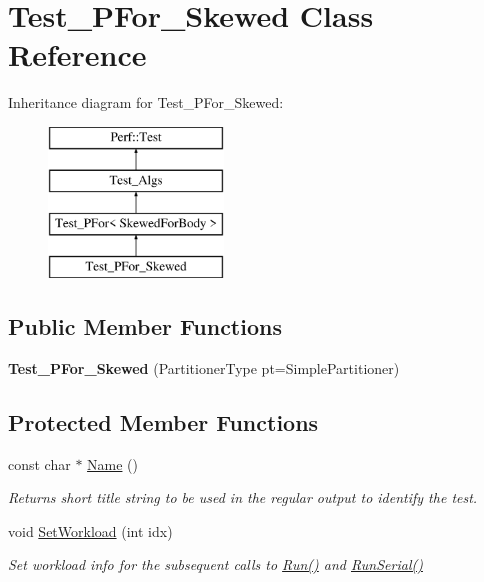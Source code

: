 \hypertarget{classTest__PFor__Skewed}{}\section{Test\+\_\+\+P\+For\+\_\+\+Skewed Class Reference}
\label{classTest__PFor__Skewed}
Inheritance diagram for Test\+\_\+\+P\+For\+\_\+\+Skewed\+:\begin{figure}[H]
\begin{center}
\leavevmode
\includegraphics[height=4.000000cm]{classTest__PFor__Skewed}
\end{center}
\end{figure}
\subsection*{Public Member Functions}
\begin{DoxyCompactItemize}
\item 
\hypertarget{classTest__PFor__Skewed_ae7f02668d34878d1515ba70faf492d5b}{}{\bfseries Test\+\_\+\+P\+For\+\_\+\+Skewed} (Partitioner\+Type pt=Simple\+Partitioner)\label{classTest__PFor__Skewed_ae7f02668d34878d1515ba70faf492d5b}

\end{DoxyCompactItemize}
\subsection*{Protected Member Functions}
\begin{DoxyCompactItemize}
\item 
const char $\ast$ \hyperlink{classTest__PFor__Skewed_a56892af93bf8191333a5d8204df1b233}{Name} ()
\begin{DoxyCompactList}\small\item\em Returns short title string to be used in the regular output to identify the test. \end{DoxyCompactList}\item 
void \hyperlink{classTest__PFor__Skewed_a8844b30c0bbfc98f57a6bc7ae295fcd5}{Set\+Workload} (int idx)
\begin{DoxyCompactList}\small\item\em Set workload info for the subsequent calls to \hyperlink{classTest__PFor_a14d67cebd4bca82da7d103686392618d}{Run()} and \hyperlink{classTest__PFor_ace2d473bba6b5c78861bec4b3167d7b6}{Run\+Serial()} \end{DoxyCompactList}\end{DoxyCompactItemize}
